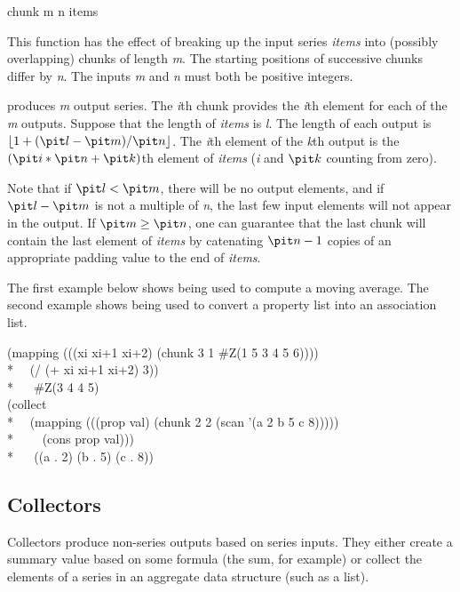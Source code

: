 \begin{defun}[Function]
chunk m n items

This function has the effect of breaking up the input series {\it items} into
(possibly overlapping) chunks of length {\it m}.  The starting positions of successive chunks differ
by {\it n}.  The inputs {\it m} and {\it n} must both be positive integers.

 produces {\it m} output series.  The {\it i\/}th chunk provides
the {\it i\/}th element for
each of  the {\it m} outputs.  Suppose that the length of {\it items} is {\it l}.
The length of
each output is $\lfloor1+({\it l}-{\it m})/{\it n}\rfloor$.
The {\it i\/}th element of the {\it k\/}th output is the
$({\it i}*{\it n}+{\it k})$th element of {\it items} ({\it i} and ${\it k}$ counting from zero).  

Note that if ${\it l}<{\it m}$, there will be no
output elements, and if ${\it l}-{\it m}$ is not a multiple of {\it n},
the last few input elements will
not appear in the output.  If ${\it m}\ge {\it n}$,
one can guarantee that the last chunk will contain the last
element of {\it items} by catenating ${\it n}-1$
copies of an appropriate padding value to the end of {\it items}.

The first example below shows 
being used to compute a moving average.  The second example shows
 being used to convert a property list into an association list.
\begin{lisp}
(mapping (((xi xi+1 xi+2) (chunk 3 1 \#Z(1 5 3 4 5 6)))) \\* 
~~(/ (+ xi xi+1 xi+2) 3)) \\*
~~{\EV} \#Z(3 4 4 5)
\\
(collect \\*
~~(mapping (((prop val) (chunk 2 2 (scan '(a 2 b 5 c 8))))) \\*
~~~~(cons prop val))) \\*
~~{\EV} ((a . 2) (b . 5) (c . 8))
\end{lisp}
\end{defun}

\subsection{Collectors}

Collectors produce non-series outputs based on series inputs.  They either
create a summary value based on some formula (the sum, for example) or collect the
elements of a series in an aggregate data structure (such as a list).

